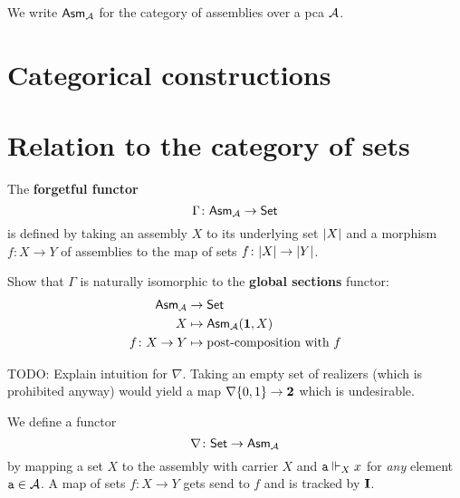 \begin{notation}[\(\Asm{\AA}\)]
  We write \(\Asm{\AA}\) for the category of assemblies over a pca \(\AA\).
\end{notation}

\begin{exercise}

\end{exercise}

\section{Categorical constructions}

\begin{exercise}\label{exer:characterise-regular-monos}

\end{exercise}

\section{Relation to the category of sets}

\begin{definition}
  The \textbf{forgetful functor}
  \[
    \Gamma \colon \Asm{\AA} \to \Set
  \]
  is defined by taking an assembly \(X\) to its underlying set \(\carrier{X}\)
  and a morphism \(f \colon X \to Y\) of assemblies to the map of sets
  \(f \colon \carrier{X} \to \carrier{Y}\).
\end{definition}

\begin{exercise}\label{exer:Gamma-global-sections}
  Show that \(\Gamma\) is naturally isomorphic to the \textbf{global sections}
  functor:
  \begin{align*}
    \Asm{\AA} &\to \Set \\
    X &\mapsto \Asm{\AA}(\One,X) \\
    f \colon X \to Y &\mapsto \text{post-composition with \(f\)}
  \end{align*}
\end{exercise}

\textcolor{Mulberry}{TODO: Explain intuition for \(\nabla\). Taking an empty set
  of realizers (which is prohibited anyway) would yield a map
  \(\nabla\set{0,1} \to \Two\) which is undesirable.}
\begin{definition}[\(\nabla\)]
  We define a functor
  \[
    \nabla \colon \Set \to \Asm{\AA}
  \]
  by mapping a set \(X\) to the assembly with carrier \(X\) and
  \(\pca{a} \realizes_X x\) for \emph{any} element \(\pca{a} \in \AA\).
  A map of sets \(f \colon X \to Y\) gets send to \(f\) and is tracked by
  \(\icomb\).
\end{definition}


